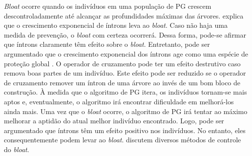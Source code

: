 \begin{figure}[H]
    \centering
    \caption{Exemplos de íntrons:  representa a expressão lógica $1 \wedge 1$ e  representa a expressão lógica $0 \vee 0$.}
    \label{fig:introns}
    \begin{subfigure}[b]{0.5\linewidth}
        \centering
        \caption{}
        \label{fig:introns-and}
    \end{subfigure}%
    \begin{subfigure}[b]{0.5\linewidth}
        \centering
        \caption{}
        \label{fig:introns-or}
    \end{subfigure}
    \begin{center}
    \end{center}
\end{figure}

\textit{Bloat} ocorre quando os indivíduos em uma população de PG crescem descontroladamente até alcançar as profundidades máximas das árvores.  explica que o crescimento exponencial de íntrons leva ao \textit{bloat}. Caso não haja uma medida de prevenção, o \textit{bloat} com certeza ocorrerá. Dessa forma, pode-se afirmar que íntrons claramente têm efeito sobre o \textit{bloat}. Entretanto, pode ser argumentado que o crescimento exponencial dos íntrons age como uma espécie de proteção global \cite{banzhaf1998}. O operador de cruzamento pode ter um efeito destrutivo caso remova boas partes de um indivíduo. Este efeito pode ser reduzido se o operador de cruzamento remover um íntron de uma árvore ao invés de um bom bloco de construção. À medida que o algoritmo de PG itera, os indivíduos tornam-se mais aptos e, eventualmente, o algoritmo irá encontrar dificuldade em melhorá-los ainda mais. Uma vez que o \textit{bloat} ocorre, o algoritmo de PG irá tentar ao máximo melhorar a aptidão do atual melhor indivíduo encontrado. Logo, pode ser argumentado que íntrons têm um efeito positivo nos indivíduos. No entanto, eles consequentemente podem levar ao \textit{bloat}.  discutem diversos métodos de controle do \textit{bloat}.
